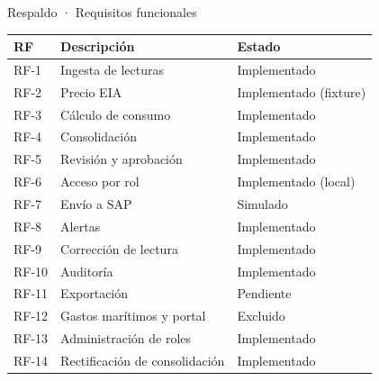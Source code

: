 \documentclass[aspectratio=169,10pt]{beamer}
\begin{document}
\appendix

\begin{frame}{Respaldo · Requisitos funcionales}
  \scriptsize
  \begin{tabular}{@{}lll@{}}
    \toprule
    \textbf{RF} & \textbf{Descripción} & \textbf{Estado} \\
    \midrule
    RF-1 & Ingesta de lecturas & Implementado \\
    RF-2 & Precio EIA & Implementado (fixture) \\
    RF-3 & Cálculo de consumo & Implementado \\
    RF-4 & Consolidación & Implementado \\
    RF-5 & Revisión y aprobación & Implementado \\
    RF-6 & Acceso por rol & Implementado (local) \\
    RF-7 & Envío a SAP & Simulado \\
    RF-8 & Alertas & Implementado \\
    RF-9 & Corrección de lectura & Implementado \\
    RF-10 & Auditoría & Implementado \\
    RF-11 & Exportación & Pendiente \\
    RF-12 & Gastos marítimos y portal & Excluido \\
    RF-13 & Administración de roles & Implementado \\
    RF-14 & Rectificación de consolidación & Implementado \\
    \bottomrule
  \end{tabular}
\end{frame}
\end{document}
